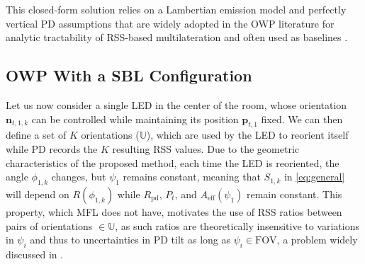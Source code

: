 \documentclass[conference]{IEEEtran}
\begin{document}
This closed-form solution relies on a Lambertian emission model and perfectly vertical PD assumptions that are widely adopted in the OWP literature for analytic tractability of RSS-based multilateration and often used as baselines \cite{Zhuang2018, Wang2024b}.

\subsection{OWP With a SBL Configuration}
\label{subsec:singleLED}
Let us now consider a single LED in the center of the room, whose orientation $\mathbf{n}_{t,1,k}$ can be controlled while maintaining its position $\mathbf{p}_{t,1}$ fixed. We can then define a set of $K$ orientations ($\mathbb{U}$), which are used by the LED to reorient itself while PD records the $K$ resulting RSS values. Due to the geometric characteristics of the proposed method, each time the LED is reoriented, the angle $\phi_{1,k}$ changes, but $\psi_1$ remains constant, meaning that $S_{1,k}$ in \eqref{eq:general} will depend on $R(\phi_{1,k})$ while $R_{\mathrm{pd}}$, $P_t$, and $A_{\mathrm{eff}}(\psi_1)$ remain constant. This property, which MFL does not have, motivates the use of RSS ratios between pairs of orientations $\in \mathbb{U}$, as such ratios are theoretically insensitive to variations in $\psi_i$ and thus to uncertainties in PD tilt as long as $\psi_i \in \mathrm{FOV}$, a problem widely discussed in \cite{Stevens2020}.
\end{document}
